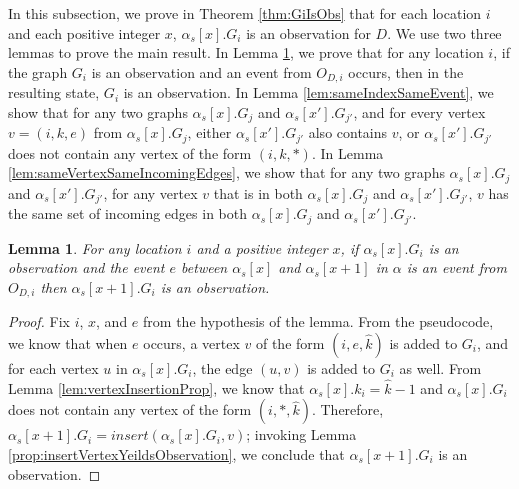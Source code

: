 \documentclass[11pt]{article}
\numberwithin{theorem}{section}
\newtheorem{lemma}[theorem]{Lemma}
\begin{document}
In this subsection, we prove in Theorem \ref{thm:GiIsObs} that for each location $i$ and each positive
integer $x$, $\alpha_s[x].G_i$ is an observation for $D$. We use two three lemmas to prove the main result. In Lemma \ref{lem:insertYeildsObservation}, we prove that for any location $i$, if the graph $G_i$ is an observation and an event from $O_{D,i}$ occurs, then in the resulting state, $G_i$ is an observation. In Lemma \ref{lem:sameIndexSameEvent}, we show that for any two graphs $\alpha_s[x].G_j$ and $\alpha_s[x'].G_{j'}$, and for every vertex $v = (i,k,e)$ from $\alpha_s[x].G_j$, either $\alpha_s[x'].G_{j'}$ also contains $v$, or $\alpha_s[x'].G_{j'}$ does not contain any vertex of the form $(i,k,*)$. In Lemma \ref{lem:sameVertexSameIncomingEdges}, we show that for any two graphs $\alpha_s[x].G_j$ and $\alpha_s[x'].G_{j'}$, for any vertex $v$ that is in both $\alpha_s[x].G_j$ and $\alpha_s[x'].G_{j'}$, $v$ has the same set of incoming edges in both $\alpha_s[x].G_j$ and $\alpha_s[x'].G_{j'}$.

\begin{lemma}\label{lem:insertYeildsObservation}
For any location $i$ and a positive integer $x$, if $\alpha_s[x].G_i$ is an observation and the event $e$ between $\alpha_s[x]$ and $\alpha_s[x+1]$ in $\alpha$ is an event from $O_{D,i}$  then $\alpha_s[x+1].G_i$ is an observation.
\end{lemma}
\begin{proof}
Fix $i$, $x$, and $e$ from the hypothesis of the lemma.
From the pseudocode, we know that when $e$ occurs, a vertex $v$ of the form $(i,e,\hat{k})$ is added to $G_i$, and for each vertex $u$ in $\alpha_s[x].G_i$, the edge $(u,v)$ is added to $G_i$ as well.
From Lemma \ref{lem:vertexInsertionProp}, we know that $\alpha_s[x].k_i = \hat{k}-1$ and $\alpha_s[x].G_i$ does not contain any vertex of the form $(i,*,\hat{k})$. 
Therefore, $\alpha_s[x+1].G_i = insert(\alpha_s[x].G_i,v)$; invoking Lemma \ref{prop:insertVertexYeildsObservation}, we conclude that $\alpha_s[x+1].G_i$ is an observation.
\end{proof}
\end{document}
